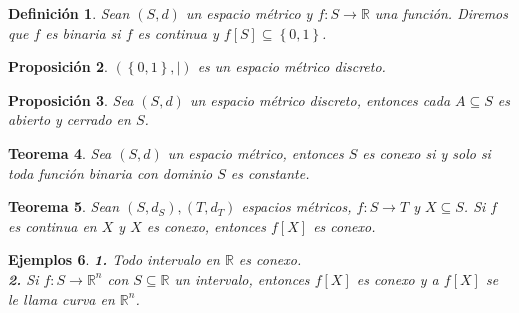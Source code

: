 \documentclass[oneside]{book} %
\theoremstyle{Teorema}
\newtheorem{Definicion}{Definición}[chapter]
\newtheorem{Teorema}[Definicion]{Teorema}
\newtheorem{Proposicion}[Definicion]{Proposición}
\theoremstyle{Ejemplos}
\newtheorem{Ejemplos}[Definicion]{Ejemplos}
\theoremstyle{[Obs]}
\newcommand{\absSymbol}{\left|\right.} %
\renewcommand{\{}{\left\lbrace} %
\renewcommand{\}}{\right\rbrace} %
\renewcommand{\sc}{\subseteq} %
\newcommand{\R}{\mathbb{R}} %
\newcommand{\Rn}{\mathbb{R}^n} %
\begin{document}
			\begin{Definicion}

				Sean $(S, d)$ un espacio métrico y $f : S \to \R$ una función. Diremos que $f$ es binaria si $f$ es continua y $f[S] \sc \{ 0, 1 \}$. \\

			\end{Definicion}

			\begin{Proposicion}

				$(\{ 0, 1 \}, \absSymbol)$ es un espacio métrico discreto. \\

			\end{Proposicion}

			\begin{Proposicion}

				Sea $(S, d)$ un espacio métrico discreto, entonces cada $A \sc S$ es abierto y cerrado en $S$. \\

			\end{Proposicion}

			\begin{Teorema}

				Sea $(S, d)$ un espacio métrico, entonces $S$ es conexo si y solo si toda función binaria con dominio $S$ es constante. \\

			\end{Teorema}

			\begin{Teorema}

				Sean $(S, d_S), (T, d_T)$ espacios métricos, $f : S \to T$ y $X \sc S$. Si $f$ es continua en $X$ y $X$ es conexo, entonces $f[X]$ es conexo. \\

			\end{Teorema}

			\begin{Ejemplos}

				\hfill

				\textbf{1.} Todo intervalo en $\R$ es conexo. \\

				\textbf{2.} Si $f : S \to \Rn$ con $S \sc \R$ un intervalo, entonces $f[X]$ es conexo y a $f[X]$ se le llama curva en $\Rn$. \\

			\end{Ejemplos}
\end{document}
